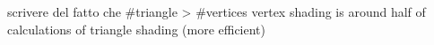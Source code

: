 scrivere del fatto che #triangle > #vertices
vertex shading is around half of calculations of triangle shading (more efficient)